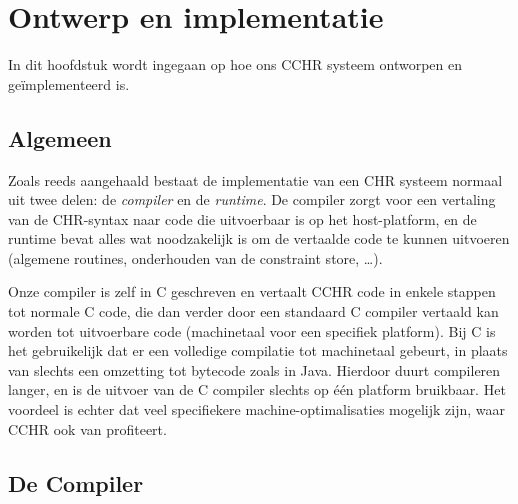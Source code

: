 \chapter{Ontwerp en implementatie} \label{chap:impl}

In dit hoofdstuk wordt ingegaan op hoe ons CCHR systeem ontworpen en ge\"implementeerd is.

\section{Algemeen} \label{sec:impl}

Zoals reeds aangehaald bestaat de implementatie van een CHR systeem normaal uit twee delen: de {\em compiler} en de {\em runtime}. De compiler zorgt voor een vertaling van de CHR-syntax naar code die uitvoerbaar is op het host-platform, en de runtime bevat alles wat noodzakelijk is om de vertaalde code te kunnen uitvoeren (algemene routines, onderhouden van de constraint store, \ldots).

Onze compiler is zelf in C geschreven en vertaalt CCHR code in enkele stappen tot normale C code, die dan verder door een standaard C compiler vertaald kan worden tot uitvoerbare code (machinetaal voor een specifiek platform). Bij C is het gebruikelijk dat er een volledige compilatie tot machinetaal gebeurt, in plaats van slechts een omzetting tot bytecode zoals in Java. Hierdoor duurt compileren langer, en is de uitvoer van de C compiler slechts op \'e\'en platform bruikbaar. Het voordeel is echter dat veel specifiekere machine-optimalisaties mogelijk zijn, waar CCHR ook van profiteert.

\section{De Compiler} \label{sec:compiler}


